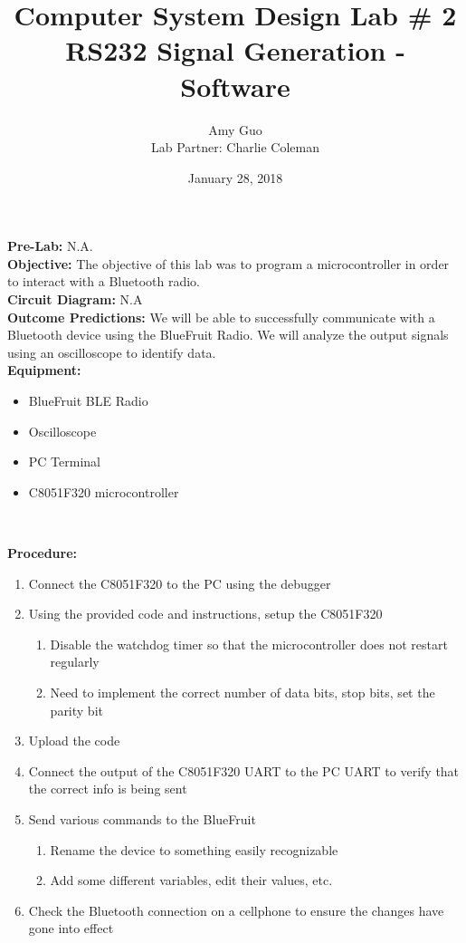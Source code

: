 \documentclass{article}
\title{Computer System Design Lab \# 2\\RS232 Signal Generation - Software}
\author{Amy Guo \\ Lab Partner: Charlie Coleman}
\date{January 28, 2018}
\begin{document}
\maketitle
\pagebreak

\noindent\textbf{Pre-Lab:} N.A.\\

\noindent\textbf{Objective:} The objective of this lab was to program a microcontroller in order to interact with a Bluetooth radio.\\

\noindent\textbf{Circuit Diagram:} N.A\\

\noindent\textbf{Outcome Predictions:} We will be able to successfully communicate with a Bluetooth device using the BlueFruit Radio. We will analyze the output signals using an oscilloscope to identify data.\\ 

\noindent\textbf{Equipment:}

\begin{itemize}[noitemsep, nolistsep]
	\item BlueFruit BLE Radio
	\item Oscilloscope
	\item PC Terminal
	\item C8051F320 microcontroller
\end{itemize}~

\noindent\textbf{Procedure:}

\begin{enumerate}
	\item Connect the C8051F320 to the PC using the debugger
	\item Using the provided code and instructions, setup the C8051F320 
	\begin{enumerate}
		\item Disable the watchdog timer so that the microcontroller does not restart regularly
		\item Need to implement the correct number of data bits, stop bits, set the parity bit
	\end{enumerate}
	\item Upload the code
	\item Connect the output of the C8051F320 UART to the PC UART to verify that the correct info is being sent
	\item Send various commands to the BlueFruit
	\begin{enumerate}
		\item Rename the device to something easily recognizable
		\item Add some different variables, edit their values, etc.
	\end{enumerate}
	\item Check the Bluetooth connection on a cellphone to ensure the changes have gone into effect
\end{enumerate}~
\end{document}
